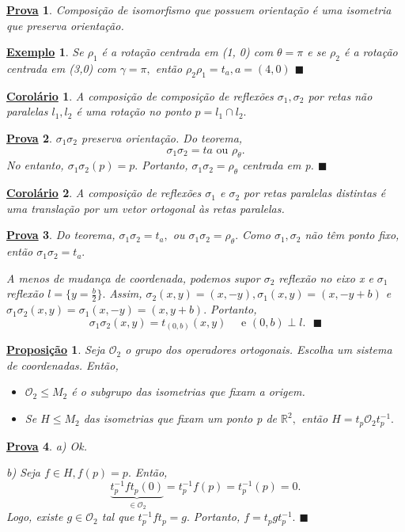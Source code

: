 \documentclass{article}
\newtheorem*{prop*}{\underline{Proposi\c c\~ao}}
\newtheorem*{crl*}{\underline{Corol\'ario}}
\newtheorem{example*}{\underline{Exemplo}}
\newtheorem*{proof*}{\underline{Prova}}
\renewcommand\qedsymbol{$\blacksquare$}
\begin{document}
\begin{proof*}
  Composição de isomorfismo que possuem orientação é uma isometria que preserva orientação.
\end{proof*}
\begin{example*}
  Se $\rho _{1}$ é a rotação centrada em (1, 0) com $\theta = \pi $ e se $\rho _{2}$ é a rotação centrada em (3,0) com
  $\gamma =\pi ,$ então $\rho _{2}\rho _{1}=t_{a}, a = (4, 0)$ \qedsymbol 
\end{example*}
\begin{crl*}
  A composição de composição de reflexões $\sigma _{1}, \sigma _{2}$ por retas não paralelas $l_{1}, l_{2}$ é uma rotação no ponto
  $p=l_{1}\cap l_{2}.$
\end{crl*}
\begin{proof*}
  $\sigma_{1}\sigma _{2}$ preserva orientação. Do teorema, 
    $$
    \sigma _{1}\sigma _{2} = ta\text{ ou } \rho _{\theta }.
    $$
  No entanto, $\sigma _{1}\sigma _{2}(p) = p.$ Portanto, $\sigma _{1}\sigma _{2} = \rho _{\theta }$ centrada em p. \qedsymbol
\end{proof*}
\begin{crl*}
  A composição de reflexões $\sigma _{1}$ e $\sigma _{2}$ por retas paralelas distintas é uma translação por um vetor ortogonal
  às retas paralelas.
\end{crl*}
\begin{proof*}
  Do teorema, $\sigma _{1}\sigma _{2} = t_{a},$ ou $\sigma _{1}\sigma _{2} = \rho _{\theta }.$ Como $\sigma _{1}, \sigma _{2}$
  não têm ponto fixo, então $\sigma _{1}\sigma _{2} = t_{a}.$

  A menos de mudança de coordenada, podemos supor $\sigma _{2}$ reflexão no eixo x e $\sigma _{1}$ reflexão $l=\{y=\frac{b}{2}\}.$ Assim,
  $\sigma _{2}(x, y) = (x, -y), \sigma _{1}(x,y) = (x, -y+b)$ e $\sigma _{1}\sigma _{2}(x, y)=\sigma _{1}(x, -y) = (x, y+b).$ Portanto,
    $$
    \sigma _{1}\sigma _{2}(x,y) = t_{(0, b)}(x,y)\quad\text{ e }(0,b)\perp l.\text{ \qedsymbol}
    $$
\end{proof*}
\begin{prop*}
  Seja $\mathcal{O}_{2}$ o grupo dos operadores ortogonais. Escolha um sistema de coordenadas. Então, 
 \begin{itemize}
   \item[a)] $\mathcal{O}_{2}\leq M_{2}$ é o subgrupo das isometrias que fixam a origem.
     \item[b)] Se $H\leq M_{2}$ das isometrias que fixam um ponto p de $\mathbb{R}^{2},$ então $H = t_{p}\mathcal{O}_{2}t_{p}^{-1}.$
 \end{itemize}
\end{prop*}
\begin{proof*}
  a) Ok.

  b) Seja $f\in H, f(p) = p.$ Então, 
    $$
    \underbrace{t_{p}^{-1}ft_{p}(0)}_{\in \mathcal{O}_{2}} = t_{p}^{-1}f(p) = t_{p}^{-1}(p) = 0.
    $$
    Logo, existe $g\in \mathcal{O}_{2}$ tal que $t_{p}^{-1}ft_{p} = g.$ Portanto, $f = t_{p}gt_{p}^{-1}.$ \qedsymbol
\end{proof*}
\newpage
\end{document}
